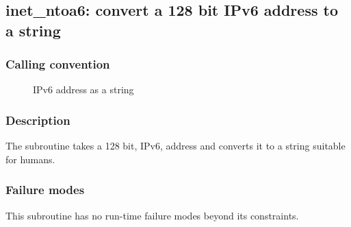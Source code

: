 \clearpage
{}
{}
\label{subr:inet-ntoa6}
\subsection*{inet\_ntoa6: convert a 128 bit IPv6 address to a string}

\subsubsection*{Calling convention}

\begin{description}
\item[] IPv6 address as a string
\end{description}

\subsubsection*{Description}

The  subroutine takes a 128 bit, IPv6, address
and converts it to a string suitable for humans.

\subsubsection*{Failure modes}

This subroutine has no run-time failure modes beyond its constraints.

